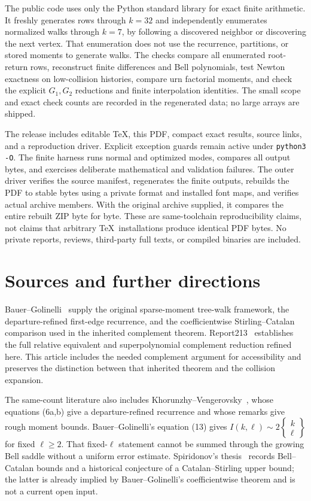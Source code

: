 \documentclass[11pt,letterpaper]{article}
\theoremstyle{remark}\newtheorem{remark}[theorem]{Remark}
\newcommand{\Stir}[2]{\left\{\begin{matrix}#1\\#2\end{matrix}\right\}}
\theoremstyle{definition}\newtheorem{definition}[theorem]{Definition}
\begin{document}
The public code uses only the Python standard library for exact finite arithmetic. It freshly generates rows through $k=32$ and independently enumerates normalized walks through $k=7$, by following a discovered neighbor or discovering the next vertex. That enumeration does not use the recurrence, partitions, or stored moments to generate walks. The checks compare all enumerated root-return rows, reconstruct finite differences and Bell polynomials, test Newton exactness on low-collision histories, compare urn factorial moments, and check the explicit $G_1,G_2$ reductions and finite interpolation identities. The small scope and exact check counts are recorded in the regenerated data; no large arrays are shipped.

The release includes editable \TeX, this PDF, compact exact results, source links, and a reproduction driver. Explicit exception guards remain active under \texttt{python3 -O}. The finite harness runs normal and optimized modes, compares all output bytes, and exercises deliberate mathematical and validation failures. The outer driver verifies the source manifest, regenerates the finite outputs, rebuilds the PDF to stable bytes using a private format and installed font maps, and verifies actual archive members. With the original archive supplied, it compares the entire rebuilt ZIP byte for byte. These are same-toolchain reproducibility claims, not claims that arbitrary \TeX\ installations produce identical PDF bytes. No private reports, reviews, third-party full texts, or compiled binaries are included.

\section{Sources and further directions}\label{sgm:co:sec:sources}
Bauer--Golinelli~\cite{bg} supply the original sparse-moment tree-walk framework, the departure-refined first-edge recurrence, and the coefficientwise Stirling--Catalan comparison used in the inherited complement theorem. Report213~\cite{r213} establishes the full relative equivalent and superpolynomial complement reduction refined here. This article includes the needed complement argument for accessibility and preserves the distinction between that inherited theorem and the collision expansion.

The same-count literature also includes Khorunzhy--Vengerovsky~\cite{kv}, whose equations (6a,b) give a departure-refined recurrence and whose remarks give rough moment bounds. Bauer--Golinelli's equation (13) gives $I(k,\ell)\sim2\Stir k\ell$ for fixed $\ell\ge2$. That fixed-$\ell$ statement cannot be summed through the growing Bell saddle without a uniform error estimate. Spiridonov's thesis~\cite[Section 3.3]{spiridonov} records Bell--Catalan bounds and a historical conjecture of a Catalan--Stirling upper bound; the latter is already implied by Bauer--Golinelli's coefficientwise theorem and is not a current open input.
\end{document}
